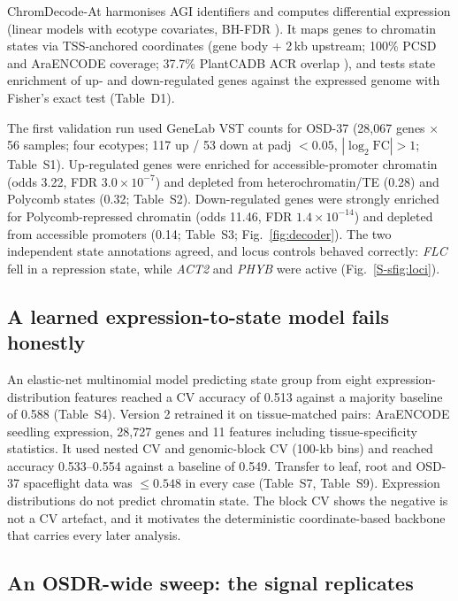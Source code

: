 \documentclass[11pt,a4paper]{article}
\newcommand{\ChromDecode}{ChromDecode-At}
\newcommand{\Sx}[1]{Table~S#1}
\begin{document}
\ChromDecode{} harmonises AGI identifiers and computes differential expression
(linear models with ecotype covariates, BH-FDR \citep{benjamini1995fdr}). It maps genes to
chromatin states via TSS-anchored coordinates (gene body + 2\,kb upstream; 100\% PCSD
and AraENCODE coverage; 37.7\% PlantCADB ACR overlap \citep{ding2023plantcadb}), and tests
state enrichment of up- and down-regulated genes against the expressed genome with
Fisher's exact test (Table~D1).

The first validation run used GeneLab VST counts for OSD-37 (28,067 genes $\times$ 56
samples; four ecotypes; 117 up / 53 down at padj $<0.05$, $|\log_2\mathrm{FC}|>1$;
\Sx{1}). Up-regulated genes were enriched for accessible-promoter chromatin (odds 3.22,
FDR $3.0\times10^{-7}$) and depleted from heterochromatin/TE (0.28) and Polycomb states
(0.32; \Sx{2}). Down-regulated genes were strongly enriched for Polycomb-repressed
chromatin (odds 11.46, FDR $1.4\times10^{-14}$) and depleted from accessible promoters
(0.14; \Sx{3}; Fig.~\ref{fig:decoder}). The two independent state annotations agreed,
and locus controls behaved correctly: \textit{FLC} fell in a repression state, while
\textit{ACT2} and \textit{PHYB} were active (Fig.~\ref{S-sfig:loci}).

\subsection{A learned expression-to-state model fails honestly}

An elastic-net multinomial model predicting state group from eight
expression-distribution features reached a CV accuracy of 0.513 against a majority
baseline of 0.588 (\Sx{4}). Version 2 retrained it on tissue-matched pairs: AraENCODE seedling
expression, 28,727 genes and 11 features including tissue-specificity statistics.
It used nested CV and genomic-block CV (100-kb bins) and reached accuracy 0.533--0.554 against
a baseline of 0.549. Transfer to leaf, root and OSD-37 spaceflight data was $\le0.548$
in every case (\Sx{7}, \Sx{9}). Expression distributions do not predict chromatin state.
The block CV shows the negative is not a CV artefact, and it motivates the
deterministic coordinate-based backbone that carries every later analysis.

\subsection{An OSDR-wide sweep: the signal replicates}
\end{document}
